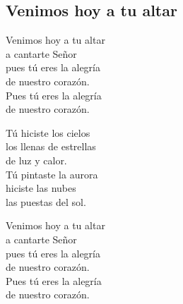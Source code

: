 \subsection{Venimos hoy a tu altar}
\begin{center}


{\Large
Venimos hoy a tu altar\\
a cantarte Señor\\                  
pues tú eres la alegría\\
de nuestro corazón.\\
Pues tú eres la alegría\\
de nuestro corazón.\\
\vspace{2em}

Tú hiciste los cielos\\
los llenas de estrellas\\
de luz y calor.\\
Tú pintaste la aurora\\
hiciste las nubes\\
las puestas del sol.\\
\vspace{2em}

Venimos hoy a tu altar\\
a cantarte Señor\\                  
pues tú eres la alegría\\
de nuestro corazón.\\
Pues tú eres la alegría\\
de nuestro corazón.\\

}\end{center}
\pagebreak